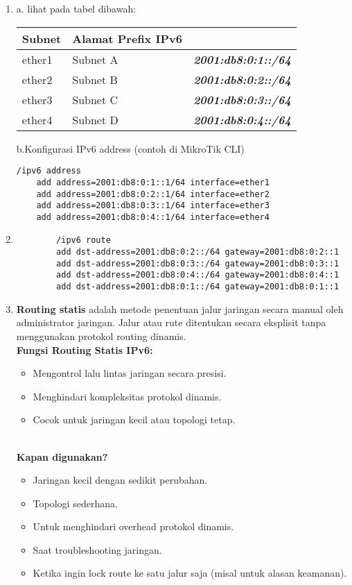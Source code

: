 \begin{enumerate}
	\item a. lihat pada tabel dibawah:\\
	\begin{table}[h!]
		\centering
		\begin{tabular}{|l|l|l|}
		\hline
		\textbf{Subnet} & \textbf{Alamat Prefix IPv6} \\ \hline
		ether1 & Subnet A & \textbf{\textit{2001:db8:0:1::/64}}\\ \hline
		ether2 & Subnet B & \textbf{\textit{2001:db8:0:2::/64}} \\ \hline
		ether3 & Subnet C & \textbf{\textit{2001:db8:0:3::/64}} \\ \hline
		ether4 & Subnet D & \textbf{\textit{2001:db8:0:4::/64}} \\ \hline
		\end{tabular}
	\end{table}

	b.Konfigurasi IPv6 address (contoh di MikroTik CLI)\\
	\begin{lstlisting}[style=bashstyle]
	/ipv6 address
	add address=2001:db8:0:1::1/64 interface=ether1
	add address=2001:db8:0:2::1/64 interface=ether2
	add address=2001:db8:0:3::1/64 interface=ether3
	add address=2001:db8:0:4::1/64 interface=ether4
	\end{lstlisting}

	\item \begin{lstlisting}
		/ipv6 route
		add dst-address=2001:db8:0:2::/64 gateway=2001:db8:0:2::1
		add dst-address=2001:db8:0:3::/64 gateway=2001:db8:0:3::1
		add dst-address=2001:db8:0:4::/64 gateway=2001:db8:0:4::1
		add dst-address=2001:db8:0:1::/64 gateway=2001:db8:0:1::1
	\end{lstlisting}

	\item \textbf{Routing statis} adalah metode penentuan jalur jaringan secara manual oleh administrator jaringan. Jalur atau rute ditentukan secara eksplisit tanpa menggunakan protokol routing dinamis.\\
	\textbf{Fungsi Routing Statis IPv6:}\\
	\begin{itemize}
		\item Mengontrol lalu lintas jaringan secara presisi.
		\item Menghindari kompleksitas protokol dinamis.
		\item Cocok untuk jaringan kecil atau topologi tetap.
	\end{itemize}\\
	\textbf{Kapan digunakan?}\\
	\begin{itemize}
		\item Jaringan kecil dengan sedikit perubahan.
		\item Topologi sederhana.
		\item Untuk menghindari overhead protokol dinamis.
		\item Saat troubleshooting jaringan.
		\item Ketika ingin lock route ke satu jalur saja (misal untuk alasan keamanan).
	\end{itemize}
\end{enumerate}